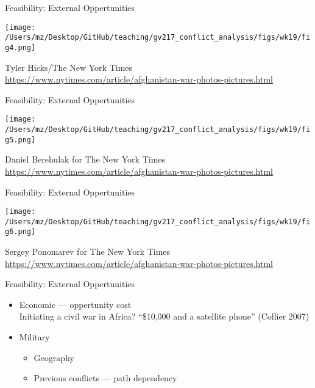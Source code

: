 \documentclass[handout]{beamer}
\begin{document}
\begin{frame}{Feasibility: External Oppertunities}
    \begin{center}
        \texttt{[image: /Users/mz/Desktop/GitHub/teaching/gv217\_conflict\_analysis/figs/wk19/fig4.png]}
    \end{center}
    \tiny Tyler Hicks/The New York Times\\ \url{https://www.nytimes.com/article/afghanistan-war-photos-pictures.html}
\end{frame}

\begin{frame}{Feasibility: External Oppertunities}
    \begin{center}
        \texttt{[image: /Users/mz/Desktop/GitHub/teaching/gv217\_conflict\_analysis/figs/wk19/fig5.png]}
    \end{center}
    \tiny Daniel Berehulak for The New York Times\\ \url{https://www.nytimes.com/article/afghanistan-war-photos-pictures.html}
\end{frame}

\begin{frame}{Feasibility: External Oppertunities}
    \begin{center}
        \texttt{[image: /Users/mz/Desktop/GitHub/teaching/gv217\_conflict\_analysis/figs/wk19/fig6.png]}
    \end{center}
    \tiny Sergey Ponomarev for The New York Times\\ \url{https://www.nytimes.com/article/afghanistan-war-photos-pictures.html}
\end{frame}

\begin{frame}{Feasibility: External Oppertunities}
    \begin{itemize}
        \item Economic --- oppertunity cost\\
              Initiating a civil war in Africa? ``\$10,000 and a satellite phone'' (Collier 2007)
        \item Military
        \begin{itemize}
            \item Geography
            \item Previous conflicts --- path dependency
        \end{itemize}
    \end{itemize}
\end{frame}
\end{document}
